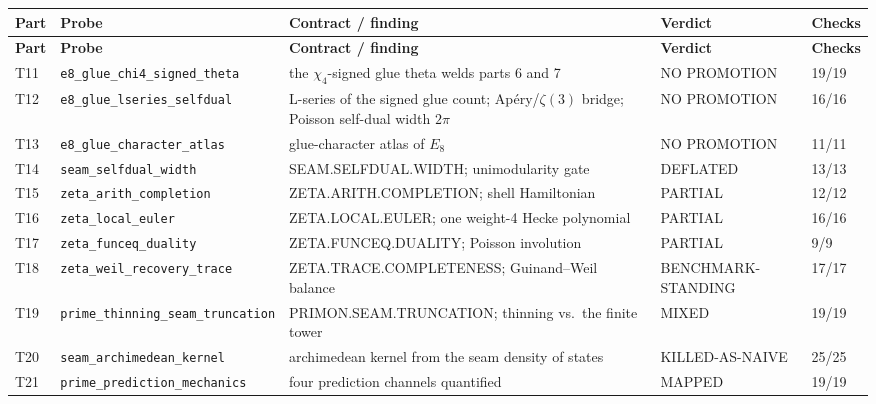 \documentclass[11pt,a4paper]{article}
\begin{document}
{\footnotesize
\setlength{\tabcolsep}{3.2pt}
\begin{xltabular}{\linewidth}{@{}p{0.95cm} >{\raggedright\arraybackslash}p{3.1cm} Y >{\raggedright\scriptsize\arraybackslash}p{3.35cm} p{1.15cm}@{}}
\toprule
\textbf{Part} & \textbf{Probe} & \textbf{Contract / finding} & \textbf{Verdict} & \textbf{Checks}\\
\midrule
\endfirsthead
\toprule
\textbf{Part} & \textbf{Probe} & \textbf{Contract / finding} & \textbf{Verdict} & \textbf{Checks}\\
\midrule
\endhead
\bottomrule
\endfoot
T11 & \texttt{\scriptsize e8\_\allowbreak glue\_\allowbreak chi4\_\allowbreak signed\_\allowbreak theta} & the $\chi_4$-signed glue theta welds parts 6 and 7 & NO PROMOTION & 19/19\\
T12 & \texttt{\scriptsize e8\_\allowbreak glue\_\allowbreak lseries\_\allowbreak selfdual} & L-series of the signed glue count; Ap\'ery/$\zeta(3)$ bridge; Poisson self-dual width $2\pi$ & NO PROMOTION & 16/16\\
T13 & \texttt{\scriptsize e8\_\allowbreak glue\_\allowbreak character\_\allowbreak atlas} & glue-character atlas of $E_8$ & NO PROMOTION & 11/11\\
T14 & \texttt{\scriptsize seam\_\allowbreak selfdual\_\allowbreak width} & SEAM.SELFDUAL.WIDTH; unimodularity gate & DEFLATED & 13/13\\
T15 & \texttt{\scriptsize zeta\_\allowbreak arith\_\allowbreak completion} & ZETA.ARITH.COMPLETION; shell Hamiltonian & PARTIAL & 12/12\\
T16 & \texttt{\scriptsize zeta\_\allowbreak local\_\allowbreak euler} & ZETA.LOCAL.EULER; one weight-4 Hecke polynomial & PARTIAL & 16/16\\
T17 & \texttt{\scriptsize zeta\_\allowbreak funceq\_\allowbreak duality} & ZETA.FUNCEQ.DUALITY; Poisson involution & PARTIAL & 9/9\\
T18 & \texttt{\scriptsize zeta\_\allowbreak weil\_\allowbreak recovery\_\allowbreak trace} & ZETA.TRACE.COMPLETENESS; Guinand--Weil balance & BENCHMARK-STANDING & 17/17\\
T19 & \texttt{\scriptsize prime\_\allowbreak thinning\_\allowbreak seam\_\allowbreak truncation} & PRIMON.SEAM.TRUNCATION; thinning vs.\ the finite tower & MIXED & 19/19\\
T20 & \texttt{\scriptsize seam\_\allowbreak archimedean\_\allowbreak kernel} & archimedean kernel from the seam density of states & KILLED-AS-NAIVE & 25/25\\
T21 & \texttt{\scriptsize prime\_\allowbreak prediction\_\allowbreak mechanics} & four prediction channels quantified & MAPPED & 19/19\\

\end{xltabular}}
\end{document}
